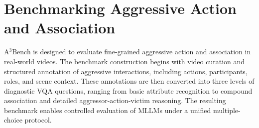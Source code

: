 \section{Benchmarking Aggressive Action and Association}
A$^3$Bench is designed to evaluate fine-grained aggressive action and association in real-world videos. The benchmark construction begins with video curation and structured annotation of aggressive interactions, including actions, participants, roles, and scene context. These annotations are then converted into three levels of diagnostic VQA questions, ranging from basic attribute recognition to compound association and detailed aggressor-action-victim reasoning. The resulting benchmark enables controlled evaluation of MLLMs under a unified multiple-choice protocol.

\begin{table}[t]
    \small
    \centering
    \caption{\textbf{Comparison of A$^3$Bench with prior crime/violence/aggressive action benchmarks.} Cls = action categories. Roles = whether explicit semantic roles (aggressor, victim, bystander) are annotated. Desc. = natural-language person descriptions. Multi-P = multi-person annotation with distinct participants. VQA = structured video question-answer pairs.
    }
    \label{tab:benchmark_comparison}
\end{table}
